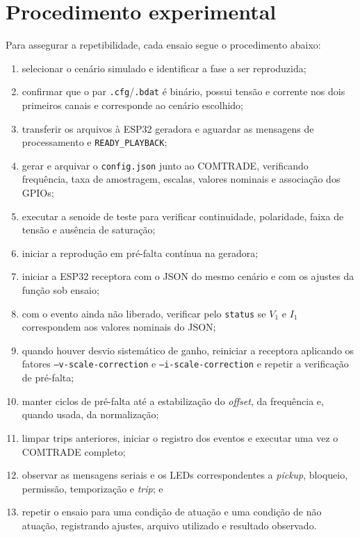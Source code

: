 \section{Procedimento experimental}

Para assegurar a repetibilidade, cada ensaio segue o procedimento abaixo:

\begin{enumerate}
  \item selecionar o cenário simulado e identificar a fase a ser reproduzida;
  \item confirmar que o par \texttt{.cfg}/\texttt{.bdat} é binário, possui tensão e corrente nos dois primeiros canais e corresponde ao cenário escolhido;
  \item transferir os arquivos à ESP32 geradora e aguardar as mensagens de processamento e \texttt{READY\_PLAYBACK};
  \item gerar e arquivar o \texttt{config.json} junto ao COMTRADE, verificando frequência, taxa de amostragem, escalas, valores nominais e associação dos GPIOs;
  \item executar a senoide de teste para verificar continuidade, polaridade, faixa de tensão e ausência de saturação;
  \item iniciar a reprodução em pré-falta contínua na geradora;
  \item iniciar a ESP32 receptora com o JSON do mesmo cenário e com os ajustes da função sob ensaio;
  \item com o evento ainda não liberado, verificar pelo \texttt{status} se $V_1$ e $I_1$ correspondem aos valores nominais do JSON;
  \item quando houver desvio sistemático de ganho, reiniciar a receptora aplicando os fatores \texttt{--v-scale-correction} e \texttt{--i-scale-correction} e repetir a verificação de pré-falta;
  \item manter ciclos de pré-falta até a estabilização do \textit{offset}, da frequência e, quando usada, da normalização;
  \item limpar trips anteriores, iniciar o registro dos eventos e executar uma vez o COMTRADE completo;
  \item observar as mensagens seriais e os LEDs correspondentes a \textit{pickup}, bloqueio, permissão, temporização e \textit{trip}; e
  \item repetir o ensaio para uma condição de atuação e uma condição de não atuação, registrando ajustes, arquivo utilizado e resultado observado.
\end{enumerate}


